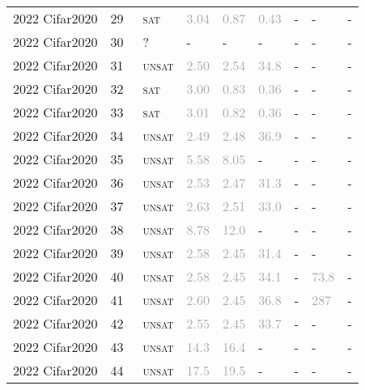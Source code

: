 \begin{center}
{\begin{longtable}{@{}lllllllll@{}}
2022 Cifar2020 & 29 & ~\textsc{sat} & \textcolor{darkgray}{3.04} & \textcolor{darkgray}{0.87} & \textcolor{darkgray}{0.43} & - & - & - \\
2022 Cifar2020 & 30 & ~? & - & - & - & - & - & - \\
2022 Cifar2020 & 31 & ~\textsc{unsat} & \textcolor{darkgray}{2.50} & \textcolor{darkgray}{2.54} & \textcolor{darkgray}{34.8} & - & - & - \\
2022 Cifar2020 & 32 & ~\textsc{sat} & \textcolor{darkgray}{3.00} & \textcolor{darkgray}{0.83} & \textcolor{darkgray}{0.36} & - & - & - \\
2022 Cifar2020 & 33 & ~\textsc{sat} & \textcolor{darkgray}{3.01} & \textcolor{darkgray}{0.82} & \textcolor{darkgray}{0.36} & - & - & - \\
2022 Cifar2020 & 34 & ~\textsc{unsat} & \textcolor{darkgray}{2.49} & \textcolor{darkgray}{2.48} & \textcolor{darkgray}{36.9} & - & - & - \\
2022 Cifar2020 & 35 & ~\textsc{unsat} & \textcolor{darkgray}{5.58} & \textcolor{darkgray}{8.05} & - & - & - & - \\
2022 Cifar2020 & 36 & ~\textsc{unsat} & \textcolor{darkgray}{2.53} & \textcolor{darkgray}{2.47} & \textcolor{darkgray}{31.3} & - & - & - \\
2022 Cifar2020 & 37 & ~\textsc{unsat} & \textcolor{darkgray}{2.63} & \textcolor{darkgray}{2.51} & \textcolor{darkgray}{33.0} & - & - & - \\
2022 Cifar2020 & 38 & ~\textsc{unsat} & \textcolor{darkgray}{8.78} & \textcolor{darkgray}{12.0} & - & - & - & - \\
2022 Cifar2020 & 39 & ~\textsc{unsat} & \textcolor{darkgray}{2.58} & \textcolor{darkgray}{2.45} & \textcolor{darkgray}{31.4} & - & - & - \\
2022 Cifar2020 & 40 & ~\textsc{unsat} & \textcolor{darkgray}{2.58} & \textcolor{darkgray}{2.45} & \textcolor{darkgray}{34.1} & - & \textcolor{darkgray}{73.8} & - \\
2022 Cifar2020 & 41 & ~\textsc{unsat} & \textcolor{darkgray}{2.60} & \textcolor{darkgray}{2.45} & \textcolor{darkgray}{36.8} & - & \textcolor{darkgray}{287} & - \\
2022 Cifar2020 & 42 & ~\textsc{unsat} & \textcolor{darkgray}{2.55} & \textcolor{darkgray}{2.45} & \textcolor{darkgray}{33.7} & - & - & - \\
2022 Cifar2020 & 43 & ~\textsc{unsat} & \textcolor{darkgray}{14.3} & \textcolor{darkgray}{16.4} & - & - & - & - \\
2022 Cifar2020 & 44 & ~\textsc{unsat} & \textcolor{darkgray}{17.5} & \textcolor{darkgray}{19.5} & - & - & - & - \\

\end{longtable}}
\end{center}

